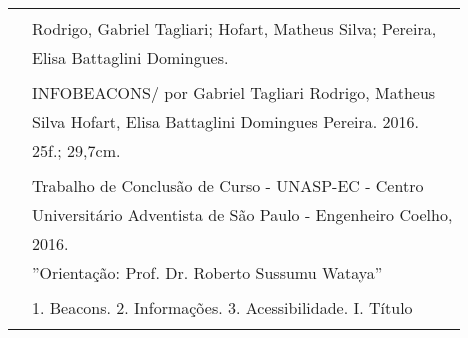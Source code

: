 

\makeindex
\makenomenclature

\newcommand{\sol}{\mathcal{R}}
\newcommand{\vei}{\rho}
\newcommand{\nInst}{100}
\newcommand{\depo}{\pi}
\newcommand{\Lum}{lengthR}
\newcommand{\Ldo}{length}
\newcommand{\maxL}{MAX\_\Lum}
\newcommand{\minC}{MIN\_SIZE_\vei}
\renewcommand{\rmdefault}{phv} %
\renewcommand{\sfdefault}{phv} %



\frenchspacing

\pretextual


\imprimircapa


\setcounter{page}{3}
\imprimirfolhaderosto*

\newpage
\thispagestyle{empty}
\null\vfill

\begin{scriptsize}
\begin{center}
\def\arraystretch{0.9}
\begin{tabular}{|cl|} \hline
\hspace{0.7cm} & \\&Rodrigo, Gabriel Tagliari; Hofart, Matheus Silva; Pereira,\\ & Elisa Battaglini Domingues.\\&\\ & \hspace{0.6cm} INFOBEACONS/ por Gabriel Tagliari Rodrigo, Matheus\\& Silva Hofart, Elisa Battaglini Domingues Pereira. 2016.\\& \hspace{0.6cm}25f.; 29,7cm. \\&\\ & \hspace{0.6cm} Trabalho de Conclusão de Curso - UNASP-EC - Centro\\& Universitário Adventista de São Paulo - Engenheiro Coelho,\\& 2016.\\& \hspace{0.6cm}''Orientação: Prof. Dr. Roberto Sussumu Wataya''\\ & \\ 
& \hspace{0.6cm} 1. Beacons. 2. Informações. 3. Acessibilidade. I. Título \\ & \\ \hline
\end{tabular}
\end{center}
\end{scriptsize}


